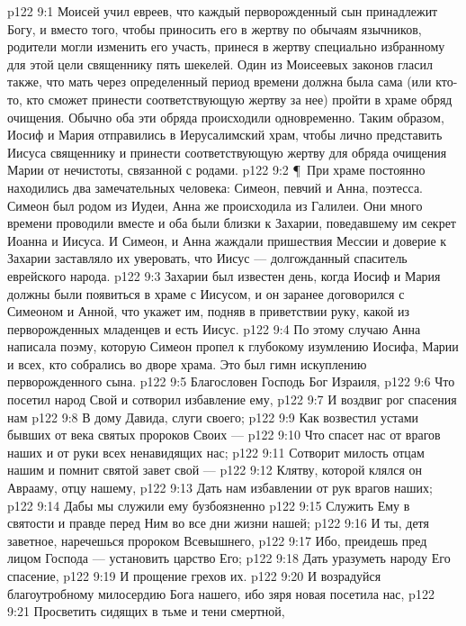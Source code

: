\vs p122 9:1 Моисей учил евреев, что каждый перворожденный сын принадлежит Богу, и вместо того, чтобы приносить его в жертву по обычаям язычников, родители могли изменить его участь, принеся в жертву специально избранному для этой цели священнику пять шекелей. Один из Моисеевых законов гласил также, что мать через определенный период времени должна была сама (или кто\hyp{}то, кто сможет принести соответствующую жертву за нее) пройти в храме обряд очищения. Обычно оба эти обряда происходили одновременно. Таким образом, Иосиф и Мария отправились в Иерусалимский храм, чтобы лично представить Иисуса священнику и принести соответствующую жертву для обряда очищения Марии от нечистоты, связанной с родами.
\vs p122 9:2 \P\ При храме постоянно находились два замечательных человека: Симеон, певчий и Анна, поэтесса. Симеон был родом из Иудеи, Анна же происходила из Галилеи. Они много времени проводили вместе и оба были близки к Захарии, поведавшему им секрет Иоанна и Иисуса. И Симеон, и Анна жаждали пришествия Мессии и доверие к Захарии заставляло их уверовать, что Иисус --- долгожданный спаситель еврейского народа.
\vs p122 9:3 Захарии был известен день, когда Иосиф и Мария должны были появиться в храме с Иисусом, и он заранее договорился с Симеоном и Анной, что укажет им, подняв в приветствии руку, какой из перворожденных младенцев и есть Иисус.
\vs p122 9:4 По этому случаю Анна написала поэму, которую Симеон пропел к глубокому изумлению Иосифа, Марии и всех, кто собрались во дворе храма. Это был гимн искуплению перворожденного сына.
\vs p122 9:5 Благословен Господь Бог Израиля,
\vs p122 9:6 Что посетил народ Свой и сотворил избавление ему,
\vs p122 9:7 И воздвиг рог спасения нам
\vs p122 9:8 В дому Давида, слуги своего;
\vs p122 9:9 Как возвестил устами бывших от века святых пророков Своих ---
\vs p122 9:10 Что спасет нас от врагов наших и от руки всех ненавидящих нас;
\vs p122 9:11 Сотворит милость отцам нашим и помнит святой завет свой ---
\vs p122 9:12 Клятву, которой клялся он Аврааму, отцу нашему,
\vs p122 9:13 Дать нам избавлении от рук врагов наших;
\vs p122 9:14 Дабы мы служили ему бузбоязненно
\vs p122 9:15 Служить Ему в святости и правде перед Ним во все дни жизни нашей;
\vs p122 9:16 И ты, детя заветное, наречешься пророком Всевышнего,
\vs p122 9:17 Ибо, преидешь пред лицом Господа --- установить царство Его;
\vs p122 9:18 Дать уразуметь народу Его спасение,
\vs p122 9:19 И прощение грехов их.
\vs p122 9:20 И возрадуйся благоутробному милосердию Бога нашего, ибо зяря новая посетила нас,
\vs p122 9:21 Просветить сидящих в тьме и тени смертной,
